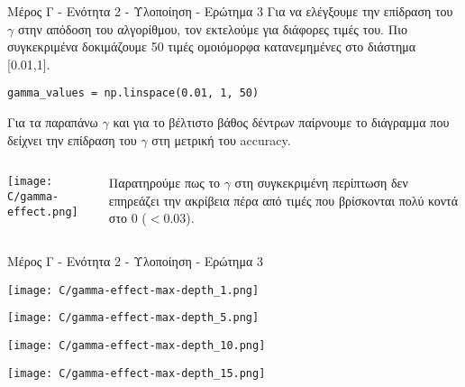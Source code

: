 \documentclass{beamer}
\begin{document}
\begin{frame}[fragile]{Μέρος Γ - Ενότητα 2 - Υλοποίηση - Ερώτημα 3}
Για να ελέγξουμε την επίδραση του $\gamma$ στην απόδοση του αλγορίθμου, τον εκτελούμε για διάφορες τιμές του. Πιο συγκεκριμένα δοκιμάζουμε 50 τιμές ομοιόμορφα κατανεμημένες στο διάστημα [0.01,1].
\lstset{style=python}
\begin{lstlisting}
gamma_values = np.linspace(0.01, 1, 50)
\end{lstlisting}
Για τα παραπάνω $\gamma$ και για το βέλτιστο βάθος δέντρων παίρνουμε το διάγραμμα που δείχνει την επίδραση του $\gamma$ στη μετρική του accuracy.
\begin{columns}[c]
    \begin{column}{0.63\textwidth}
        \texttt{[image: C/gamma-effect.png]}
    \end{column}
    
    \begin{column}{0.33\textwidth}
        Παρατηρούμε πως το $\gamma$ στη συγκεκριμένη περίπτωση δεν επηρεάζει την ακρίβεια πέρα από τιμές που βρίσκονται πολύ κοντά στο 0 ($<0.03$).
    \end{column}
\end{columns}
\end{frame}

\begin{frame}[fragile]{Μέρος Γ - Ενότητα 2 - Υλοποίηση - Ερώτημα 3}
\begin{minipage}[t]{0.49\textwidth} %
    \centering
    \texttt{[image: C/gamma-effect-max-depth\_1.png]}
\end{minipage}
\hfill
\begin{minipage}[t]{0.49\textwidth} %
    \centering
    \texttt{[image: C/gamma-effect-max-depth\_5.png]}
\end{minipage}

\begin{minipage}[t]{0.49\textwidth} %
    \centering
    \texttt{[image: C/gamma-effect-max-depth\_10.png]}
\end{minipage}
\hfill
\begin{minipage}[t]{0.49\textwidth} %
    \centering
    \texttt{[image: C/gamma-effect-max-depth\_15.png]}
\end{minipage}
\end{frame}
\end{document}
